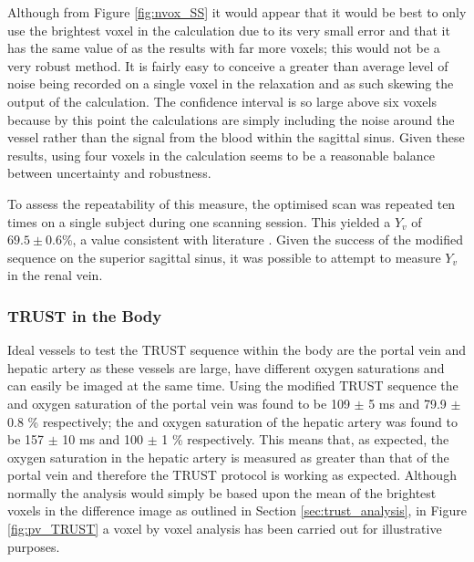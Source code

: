 Although from Figure \ref{fig:nvox_SS} it would appear that it would be best to only use the brightest voxel in the calculation due to its very small error and that it has the same value of \ttwo as the results with far more voxels; this would not be a very robust method. It is fairly easy to conceive a greater than average level of noise being recorded on a single voxel in the relaxation and as such skewing the output of the calculation. The confidence interval is so large above six voxels because by this point the calculations are simply including the noise around the vessel rather than the signal from the blood within the sagittal sinus. Given these results, using four voxels in the calculation seems to be a reasonable balance between uncertainty and robustness.

To assess the repeatability of this measure, the optimised scan was repeated ten times on a single subject during one scanning session. This yielded a $Y_v$ of $69.5\pm0.6$\%, a value consistent with literature \cite{nagdyman_comparison_2005, liu_multi-site_2016}. Given the success of the modified sequence on the superior sagittal sinus, it was possible to attempt to measure $Y_v$ in the renal vein.

\subsubsection{\ac{TRUST} in the Body}

Ideal vessels to test the \ac{TRUST} sequence within the body are the portal vein and hepatic artery as these vessels are large, have different oxygen saturations and can easily be imaged at the same time. Using the modified \ac{TRUST} sequence the \ttwo and oxygen saturation of the portal vein was found to be 109 $\pm$ 5 ms and 79.9 $\pm$ 0.8 \% respectively; the \ttwo and oxygen saturation of the hepatic artery was found to be 157 $\pm$ 10 ms and 100 $\pm$ 1 \% respectively. This means that, as expected, the oxygen saturation in the hepatic artery is measured as greater than that of the portal vein and therefore the \ac{TRUST} protocol is working as expected. Although normally the analysis would simply be based upon the mean of the brightest voxels in the difference image as outlined in Section \ref{sec:trust_analysis}, in Figure \ref{fig:pv_TRUST} a voxel by voxel analysis has been carried out for illustrative purposes.


